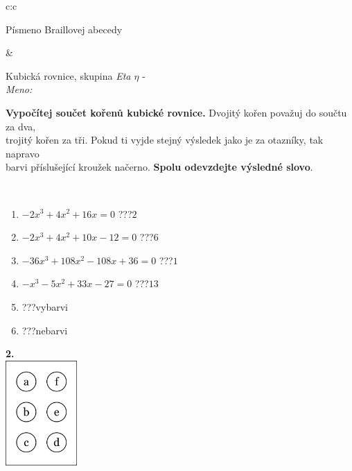 \documentclass[10pt]{report}
\begin{document}
\begin{tabular}{c:c}
\begin{minipage}[c][104.5mm][t]{0.5\linewidth}
\begin{center}
\begin{minipage}{0.20\linewidth}
\begin{center}
{\small Písmeno Braillovej abecedy}
\end{center}
\end{minipage}
\end{center}
\end{minipage}
&
\begin{minipage}[c][104.5mm][t]{0.5\linewidth}
\begin{center}
\vspace{7mm}
{\huge Kubická rovnice, skupina \textit{Eta $\eta$} -}\\[5mm]
\textit{Meno:}\phantom{xxxxxxxxxxxxxxxxxxxxxxxxxxxxxxxxxxxxxxxxxxxxxxxxxxxxxxxxxxxxxxxxx}\\[5mm]
\begin{minipage}{0.95\linewidth}
\textbf{Vypočítej součet kořenů kubické rovnice.} Dvojitý kořen považuj do součtu za dva,\\trojitý kořen za tři. Pokud ti vyjde stejný výsledek jako je za otazníky, tak napravo\\barvi příslušející kroužek načerno. \textbf{Spolu odevzdejte výsledné slovo}.
\end{minipage}
\\[1mm]
\begin{minipage}{0.79\linewidth}
\begin{center}
\begin{varwidth}{\linewidth}
\begin{enumerate}
\Large
\item $-2x^3+4x^2+16x=0$\quad \dotfill\; ???\;\dotfill \quad $2$
\item $-2x^3+4x^2+10x-12=0$\quad \dotfill\; ???\;\dotfill \quad $6$
\item $-36x^3+108x^2-108x+36=0$\quad \dotfill\; ???\;\dotfill \quad $1$
\item $-x^3-5x^2+33x-27=0$\quad \dotfill\; ???\;\dotfill \quad $13$
\item \quad \dotfill\; ???\;\dotfill \quad vybarvi
\item \quad \dotfill\; ???\;\dotfill \quad nebarvi
\end{enumerate}
\end{varwidth}
\end{center}
\end{minipage}
\begin{minipage}{0.20\linewidth}
\begin{center}
{\Huge\bfseries 2.} \\[2mm]
\includegraphics[height=40mm]{../images/braille.png}

\end{center}
\end{minipage}
\end{center}
\end{minipage}
\end{tabular}
\end{document}
